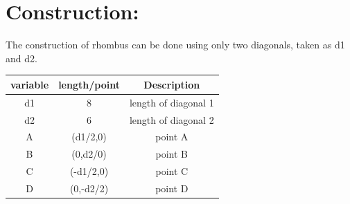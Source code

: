 \documentclass[a4paper,12pt,twocolumn]{article}
\begin{document}
\section{Construction:}
The construction of rhombus can be done using only two diagonals, taken as d1 and d2.
\begin{table}[h]
	\centering
\setlength\extrarowheight{2pt}
	\begin{tabular}{|c|c|c|}
		\hline
		\textbf{variable} & \textbf{length/point} & \textbf{Description}\\
		\hline
		d1 & 8 & length of diagonal 1\\
		\hline
		d2 & 6 & length of diagonal 2\\
		\hline
		A & (d1/2,0) & point A\\
		\hline                   
		B & (0,d2/0) & point B\\
		\hline
		C & (-d1/2,0) & point C\\
		\hline
		D & (0,-d2/2) & point D\\
		\hline
	\end{tabular}
\end{table}
\end{document}
